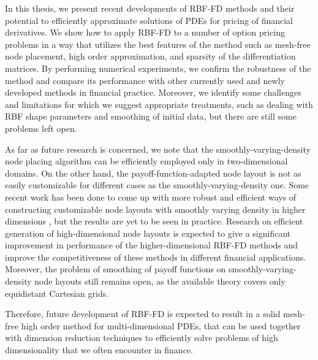 \documentclass{UUThesisTemplate}
\begin{document}
\par 
In this thesis, we present recent developments of RBF-FD methods and their potential to efficiently approximate solutions of PDEs for pricing of financial derivatives. We show how to apply RBF-FD to a number of option pricing problems in a way that utilizes the best features of the method such as mesh-free node placement, high order approximation, and sparsity of the differentiation matrices. By performing numerical experiments, we confirm the robustness of the method and compare its performance with other currently used and newly developed methods in financial practice. Moreover, we identify some challenges and limitations for which we suggest appropriate treatments, such as dealing with RBF shape parameters and smoothing of initial data, but there are still some problems left open.  

\par
As far as future research is concerned, we note that the smoothly-varying-density node placing algorithm can be efficiently employed only in two-dimensional domains. On the other hand, the payoff-function-adapted node layout is not as easily customizable for different cases as the smoothly-varying-density one. Some recent work has been done to come up with more robust and efficient ways of constructing customizable node layouts with smoothly varying density in higher dimensions \cite{vlasiuk2017fast}, but the results are yet to be seen in practice. Research on efficient generation of high-dimensional node layouts is expected to give a significant improvement in performance of the higher-dimensional RBF-FD methods and improve the competitiveness of these methods in different financial applications. Moreover, the problem of smoothing of payoff functions on smoothly-varying-density node layouts still remains open, as the available theory covers only equidistant Cartesian grids.

\par
Therefore, future development of RBF-FD is expected to result in a solid mesh-free high order method for multi-dimensional PDEs, that can be used together with dimension reduction techniques to efficiently solve problems of high dimensionality that we often encounter in finance.
\end{document}
